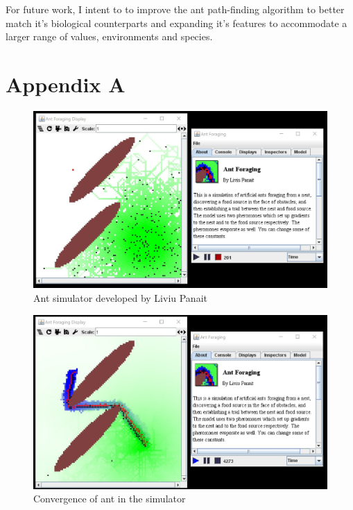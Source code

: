 \documentclass[a4paper, oneside, 11pt]{report}
\begin{document}
For future work, I intent to to improve the ant path-finding algorithm to better match it's biological counterparts and expanding it's features to accommodate a larger range of values, environments and species.





\chapter*{Appendix A}
\begin{figure}[htb]
	\begin{center}
	\includegraphics[width=0.95 \columnwidth]{MASON_Ant.jpg}
	\caption{Ant simulator developed by Liviu Panait \citep{Ant_Simulator}}
	\label{fig:MASON_Ant}
	\end{center}
\end{figure}

\begin{figure}[htb]
	\begin{center}
	\includegraphics[width=0.95 \columnwidth]{MASON_Ant_Converged.jpg}
	\caption{Convergence of ant in the simulator \citep{Ant_Simulator}}
	\label{fig:MASON_Ant_Converged}
	\end{center}
\end{figure}
\end{document}
